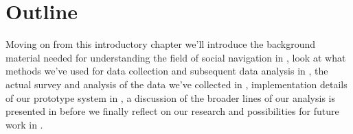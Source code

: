 \section{Outline}

Moving on from this introductory chapter we'll introduce the background
material needed for understanding the field of social
navigation in , look at what methods we've
used for data collection and subsequent data analysis in
, the actual survey and analysis of the data
we've collected in , implementation details
of our prototype system in , a discussion of the
broader lines of our analysis is presented in 
before we finally reflect on our research and possibilities for future work
in .
